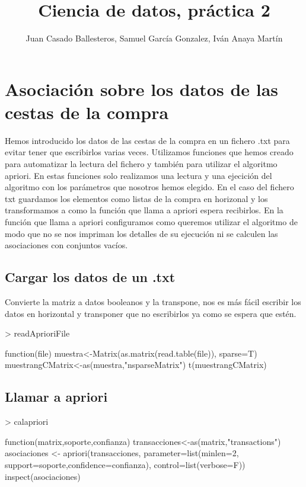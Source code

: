 \documentclass [a4paper] {article}
\title{Ciencia de datos, práctica 2}
\author{Juan Casado Ballesteros, Samuel García Gonzalez, Iván Anaya Martín}
\begin{document}
\maketitle

\begin{abstract}

\end{abstract}

\newpage
\tableofcontents
\newpage


\section{Asociación sobre los datos de las cestas de la compra}
Hemos introducido los datos de las cestas de la compra en un fichero .txt para evitar tener que escribirlos varias veces.
Utilizamos funciones que hemos creado para automatizar la lectura del fichero y también para utilizar el algoritmo apriori.
En estas funciones solo realizamos una lectura y una ejecición del algoritmo con los parámetros que nosotros hemos elegido.
En el caso del fichero txt guardamos los elementos como listas de la compra en horizonal y los transformamos a como la función que llama a apriori espera recibirlos.
En la función que llama a apriori configuramos como queremos utilizar el algoritmo de modo que no se nos impriman los detalles de su ejecución
ni se calculen las asociaciones con conjuntos vacíos.

\subsection{Cargar los datos de un .txt}
Convierte la matriz a datos booleanos y la transpone, nos es más fácil escribir los datos en horizontal y transponer que no escribirlos ya como se espera que estén.
\begin{Schunk}
\begin{Sinput}
> readAprioriFile
\end{Sinput}
\begin{Soutput}
function(file){
  muestra<-Matrix(as.matrix(read.table(file)), sparse=T)
  muestrangCMatrix<-as(muestra,"nsparseMatrix")
  t(muestrangCMatrix)
}
\end{Soutput}
\end{Schunk}

\subsection{Llamar a apriori}
\begin{Schunk}
\begin{Sinput}
> calapriori
\end{Sinput}
\begin{Soutput}
function(matrix,soporte,confianza){
    transacciones<-as(matrix,"transactions")
    asociaciones <- apriori(transacciones, 
        parameter=list(minlen=2, support=soporte,confidence=confianza), 
        control=list(verbose=F))
    inspect(asociaciones)
}
\end{Soutput}
\end{Schunk}
\end{document}
